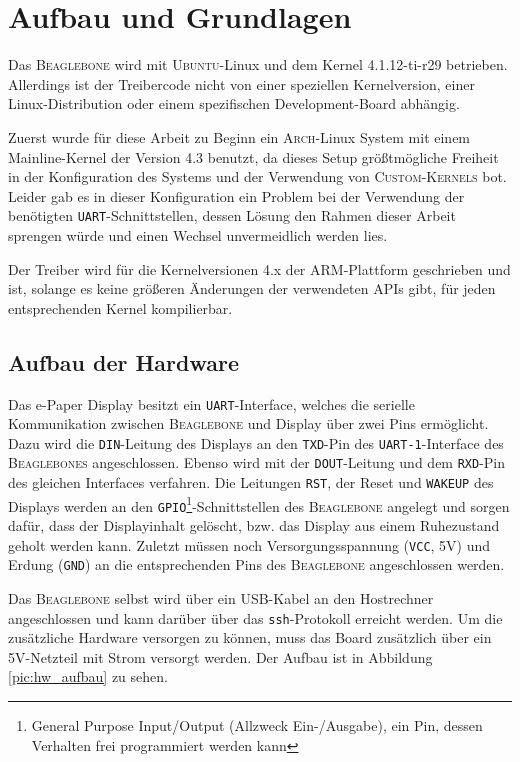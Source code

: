 \chapter{Aufbau und Grundlagen} %
Das \textsc{Beaglebone} wird mit \textsc{Ubuntu}-Linux und dem Kernel 4.1.12-ti-r29 betrieben. Allerdings ist der Treibercode nicht von einer speziellen Kernelversion, einer Linux-Distribution oder einem spezifischen Development-Board abhängig. 

Zuerst wurde für diese Arbeit zu Beginn ein \textsc{Arch}-Linux System mit einem Mainline-Kernel der Version 4.3 benutzt, da dieses Setup größtmögliche Freiheit in der Konfiguration des Systems und der Verwendung von \textsc{Custom-Kernels} bot. Leider gab es in dieser Konfiguration ein Problem bei der Verwendung der benötigten \texttt{UART}-Schnittstellen, dessen Lösung den Rahmen dieser Arbeit sprengen würde und einen Wechsel unvermeidlich werden lies.

Der Treiber wird für die Kernelversionen 4.x der \textsc{ARM}-Plattform geschrieben und ist, solange es keine größeren Änderungen der verwendeten APIs gibt, für jeden entsprechenden Kernel kompilierbar.

\section{Aufbau der Hardware}
Das e-Paper Display besitzt ein \texttt{UART}-Interface, welches die serielle Kommunikation zwischen \textsc{Beaglebone} und Display über zwei Pins ermöglicht. Dazu wird die \texttt{DIN}-Leitung des Displays an den \texttt{TXD}-Pin des \texttt{UART-1}-Interface des \textsc{Beaglebones} angeschlossen. Ebenso wird mit der \texttt{DOUT}-Leitung und dem \texttt{RXD}-Pin des gleichen Interfaces verfahren. Die Leitungen \texttt{RST}, der Reset und \texttt{WAKEUP} des Displays werden an den \texttt{GPIO}\footnote{General Purpose Input/Output (Allzweck Ein-/Ausgabe), ein Pin, dessen Verhalten frei programmiert werden kann}-Schnittstellen des \textsc{Beaglebone} angelegt und sorgen dafür, dass der Displayinhalt gelöscht, bzw. das Display aus einem Ruhezustand geholt werden kann. Zuletzt müssen noch Versorgungsspannung (\texttt{VCC}, 5V) und Erdung (\texttt{GND}) an die entsprechenden Pins des \textsc{Beaglebone} angeschlossen werden.  

Das \textsc{Beaglebone} selbst wird über ein USB-Kabel an den Hostrechner angeschlossen und kann darüber über das \texttt{ssh}-Protokoll erreicht werden. Um die zusätzliche Hardware versorgen zu können, muss das Board zusätzlich über ein 5V-Netzteil mit Strom versorgt werden. Der Aufbau ist in Abbildung \ref{pic:hw_aufbau} zu sehen.

